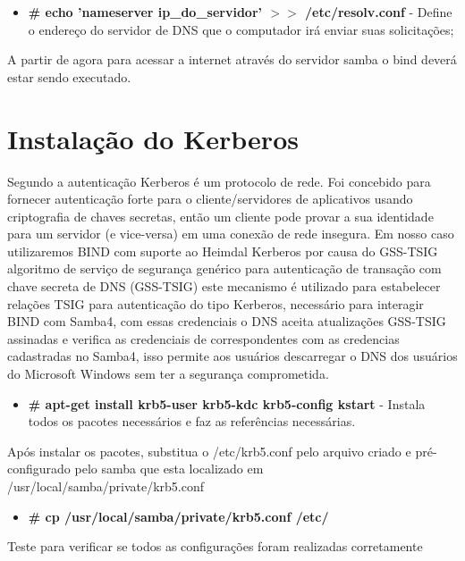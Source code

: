 \begin{itemize}
	\item \textbf{\# echo 'nameserver ip\_do\_servidor' $>$$>$ /etc/resolv.conf} - Define o endereço do servidor de DNS que o computador irá enviar suas solicitações;
\end{itemize}

A partir de agora para acessar a internet através do servidor samba o bind deverá estar sendo executado.

\section{Instalação do Kerberos}

Segundo \cite{HEIMDAL} a autenticação Kerberos é um protocolo de rede. Foi concebido para fornecer autenticação forte para o cliente/servidores de aplicativos usando criptografia de chaves secretas, então um cliente pode provar a sua identidade para um servidor (e vice-versa) em uma conexão de rede insegura.
Em nosso caso utilizaremos BIND com suporte ao Heimdal Kerberos por causa do GSS-TSIG algoritmo de serviço de segurança genérico para autenticação de transação com chave secreta de DNS (GSS-TSIG) este mecanismo é utilizado para estabelecer relações TSIG para autenticação do tipo Kerberos, necessário para interagir BIND com Samba4, com essas credenciais o DNS aceita atualizações GSS-TSIG assinadas e verifica as credenciais de correspondentes com as credencias cadastradas no Samba4, isso permite aos usuários descarregar o DNS dos usuários do Microsoft Windows sem ter a segurança comprometida.

\begin{itemize}
	\item \textbf{\# apt-get install krb5-user krb5-kdc krb5-config kstart} - Instala todos os pacotes necessários e faz as referências necessárias.
\end{itemize}

Após instalar os pacotes, substitua o /etc/krb5.conf pelo arquivo criado e pré-configurado pelo samba que esta localizado em /usr/local/samba/private/krb5.conf

\begin{itemize}
	\item \textbf{\# cp /usr/local/samba/private/krb5.conf  /etc/}
\end{itemize}

Teste para verificar se todos as configurações foram realizadas corretamente

